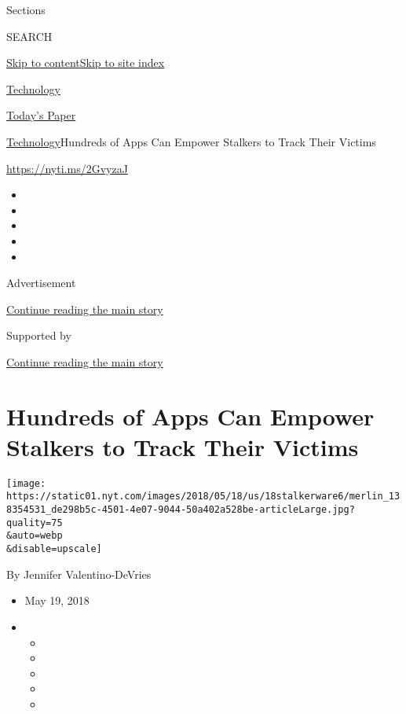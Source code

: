 Sections

SEARCH

\protect\hyperlink{site-content}{Skip to
content}\protect\hyperlink{site-index}{Skip to site index}

\href{https://www.nytimes.com/section/technology}{Technology}

\href{https://myaccount.nytimes.com/auth/login?response_type=cookie\&client_id=vi}{}

\href{https://www.nytimes.com/section/todayspaper}{Today's Paper}

\href{/section/technology}{Technology}\textbar{}Hundreds of Apps Can
Empower Stalkers to Track Their Victims

\url{https://nyti.ms/2GvyzaJ}

\begin{itemize}
\item
\item
\item
\item
\item
\end{itemize}

Advertisement

\protect\hyperlink{after-top}{Continue reading the main story}

Supported by

\protect\hyperlink{after-sponsor}{Continue reading the main story}

\hypertarget{hundreds-of-apps-can-empower-stalkers-to-track-their-victims}{%
\section{Hundreds of Apps Can Empower Stalkers to Track Their
Victims}\label{hundreds-of-apps-can-empower-stalkers-to-track-their-victims}}

\texttt{[image: https://static01.nyt.com/images/2018/05/18/us/18stalkerware6/merlin\_138354531\_de298b5c-4501-4e07-9044-50a402a528be-articleLarge.jpg?quality=75\\\&auto=webp\\\&disable=upscale]}

By Jennifer Valentino-DeVries

\begin{itemize}
\item
  May 19, 2018
\item
  \begin{itemize}
  \item
  \item
  \item
  \item
  \item
  \end{itemize}
\end{itemize}

